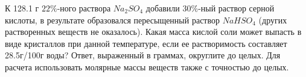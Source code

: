 
К 128.1 г $22\%$-ного раствора $Na_2SO_4$ добавили
$30\%$-ный раствор серной кислоты, в результате образовался пересыщенный раствор $NaHSO_4$ 
(других растворенных веществ не оказалось). Какая
масса кислой соли может выпасть в виде кристаллов при данной температуре, если
ее растворимость составляет 28.5г/100г воды? Ответ, выраженный в граммах,
округлите до целых. Для расчета использовать молярные массы веществ также с
точностью до целых.



